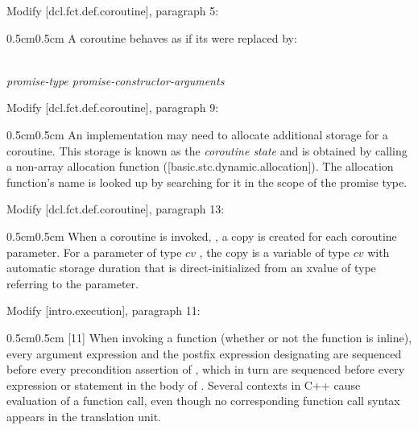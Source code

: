 Modify [dcl.fct.def.coroutine], paragraph 5:
\begin{adjustwidth}{0.5cm}{0.5cm}
A coroutine behaves as if its  were replaced by: 

\phantom{~~~}\tcode{\{} \\
\phantom{~~~~~~}\emph{promise-type  promise-constructor-arguments} \tcode{;} \\
\phantom{~~~~~~}\tcode{[...]}
\end{adjustwidth}

Modify [dcl.fct.def.coroutine], paragraph 9:
\begin{adjustwidth}{0.5cm}{0.5cm}
An implementation may need to allocate additional storage for a coroutine. This storage is known as the \emph{coroutine state} and is obtained by calling a non-array allocation function ([basic.stc.dynamic.allocation]). The allocation function's name is looked up by searching for it in the scope of the promise type.
\end{adjustwidth}

Modify [dcl.fct.def.coroutine], paragraph 13:
\begin{adjustwidth}{0.5cm}{0.5cm}
When a coroutine is invoked, , a copy is created for each coroutine parameter. For a parameter  of type $cv$ , the copy is a variable of type $cv$  with automatic storage duration that is direct-initialized from an xvalue of type  referring to the parameter.

\end{adjustwidth}

Modify [intro.execution], paragraph 11:

\begin{adjustwidth}{0.5cm}{0.5cm}
[11]  When invoking a function  (whether or not the function is inline),
every argument expression and the postfix expression designating  are
sequenced before every precondition assertion of , which in turn are sequenced before
every expression or statement in the body of
.
Several contexts in C++ cause evaluation of a function call, even though no
corresponding function call syntax appears in the translation unit.
\end{adjustwidth}

